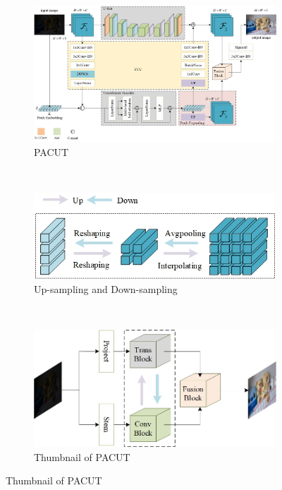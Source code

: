 \documentclass[a4paper, 10pt]{article}
\begin{document}
		\begin{figure}[htb] 
			\centering 
			
			\begin{subfigure}{\textwidth}
				\includegraphics[width=\linewidth]{picture/LLIE/My Architecture/The proposed initial architecture.jpg}
				\captionsetup{font=scriptsize}
				\caption{PACUT}
				\label{fig: First Architecture}
			\end{subfigure}\\
			\begin{subfigure}{0.4\textwidth}
				\includegraphics[width=\linewidth]{picture/LLIE/My Architecture/Up-sampling and down-sampling}
				\captionsetup{font=scriptsize}
				\caption{Up-sampling and Down-sampling}
				\label{fig: Up-sampling and down-sampling}
			\end{subfigure} \
			\begin{subfigure}{0.4\textwidth}
				\includegraphics[width=\linewidth]{picture/LLIE/My Architecture/The proposed initial architecture(Abstract Picture)}
				\captionsetup{font=scriptsize}
				\caption{Thumbnail of PACUT}
				\label{fig: The proposed initial architecture(Abstract Picture)}	
			\end{subfigure}
			

\end{figure}
\end{document}
